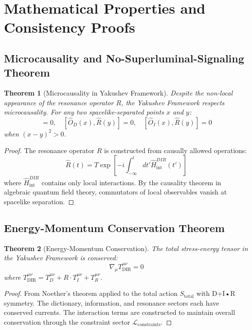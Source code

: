 \documentclass[11pt,a4paper]{article}
\newtheorem{theorem}{Theorem}
\begin{document}
	\section{Mathematical Properties and Consistency Proofs}
	\subsection{Microcausality and No-Superluminal-Signaling Theorem}
	
	\begin{theorem}[Microcausality in Yakushev Framework]
		Despite the non-local appearance of the resonance operator $R$, the Yakushev Framework respects microcausality. For any two spacelike-separated points $x$ and $y$:
		\begin{equation}
			[\hat{O}_D(x), \hat{O}_I(y)] = 0, \quad [\hat{O}_D(x), \hat{R}(y)] = 0, \quad [\hat{O}_I(x), \hat{R}(y)] = 0
		\end{equation}
		when $(x-y)^2 > 0$.
	\end{theorem}
	
	\begin{proof}
		The resonance operator $R$ is constructed from causally allowed operations:
		\begin{equation}
			\hat{R}(t) = T \exp\left[ -i \int_{-\infty}^t dt' \hat{H}_{\text{int}}^{DIR}(t') \right]
		\end{equation}
		where $\hat{H}_{\text{int}}^{DIR}$ contains only local interactions. By the causality theorem in algebraic quantum field theory, commutators of local observables vanish at spacelike separation.
	\end{proof}
	
	\subsection{Energy-Momentum Conservation Theorem}
	
	\begin{theorem}[Energy-Momentum Conservation]
		The total stress-energy tensor in the Yakushev Framework is conserved:
		\begin{equation}
			\boxed{\nabla_\mu T^{\mu\nu}_{\text{DIR}} = 0}
		\end{equation}
		where $T^{\mu\nu}_{\text{DIR}} = T^{\mu\nu}_D + R \cdot T^{\mu\nu}_I + T^{\mu\nu}_R$.
	\end{theorem}
	
	\begin{proof}
		From Noether's theorem applied to the total action $S_{\text{total}}$ with D+I•R symmetry. The dictionary, information, and resonance sectors each have conserved currents. The interaction terms are constructed to maintain overall conservation through the constraint sector $\mathcal{L}_{\text{constraints}}$.
	\end{proof}
	
\end{document}
